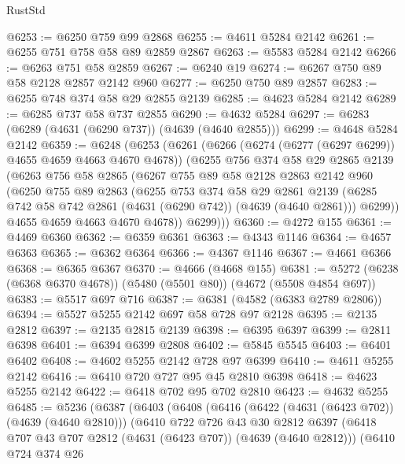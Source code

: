 \begin{lexlean}{RustStd}
\begin{coremodule}
@6253 := @6250 @759 @99 @2868
@6255 := @4611 @5284 @2142
@6261 := @6255 @751 @758 @58 @89 @2859 @2867
@6263 := @5583 @5284 @2142
@6266 := @6263 @751 @58 @2859
@6267 := @6240 @19
@6274 := @6267 @750 @89 @58 @2128 @2857 @2142 @960
@6277 := @6250 @750 @89 @2857
@6283 := @6255 @748 @374 @58 @29 @2855 @2139
@6285 := @4623 @5284 @2142
@6289 := @6285 @737 @58 @737 @2855
@6290 := @4632 @5284
@6297 := @6283 (@6289 (@4631 (@6290 @737)) (@4639 (@4640 @2855)))
@6299 := @4648 @5284 @2142
@6359 := @6248
    (@6253
      (@6261
        (@6266 (@6274 (@6277 (@6297 @6299)) @4655 @4659 @4663 @4670 @4678))
        (@6255
          @756
          @374
          @58
          @29
          @2865
          @2139
          (@6263
            @756
            @58
            @2865
            (@6267
              @755
              @89
              @58
              @2128
              @2863
              @2142
              @960
              (@6250
                @755
                @89
                @2863
                (@6255
                  @753
                  @374
                  @58
                  @29
                  @2861
                  @2139
                  (@6285 @742 @58 @742 @2861 (@4631 (@6290 @742)) (@4639 (@4640 @2861)))
                  @6299))
              @4655
              @4659
              @4663
              @4670
              @4678))
          @6299)))
@6360 := @4272 @155
@6361 := @4469 @6360
@6362 := @6359 @6361
@6363 := @4343 @1146
@6364 := @4657 @6363
@6365 := @6362 @6364
@6366 := @4367 @1146
@6367 := @4661 @6366
@6368 := @6365 @6367
@6370 := @4666 (@4668 @155)
@6381 := @5272 (@6238 (@6368 @6370 @4678)) (@5480 (@5501 @80)) (@4672 (@5508 @4854 @697))
@6383 := @5517 @697 @716
@6387 := @6381 (@4582 (@6383 @2789 @2806))
@6394 := @5527 @5255 @2142 @697 @58 @728 @97 @2128
@6395 := @2135 @2812
@6397 := @2135 @2815 @2139
@6398 := @6395 @6397
@6399 := @2811 @6398
@6401 := @6394 @6399 @2808
@6402 := @5845 @5545
@6403 := @6401 @6402
@6408 := @4602 @5255 @2142 @728 @97 @6399
@6410 := @4611 @5255 @2142
@6416 := @6410 @720 @727 @95 @45 @2810 @6398
@6418 := @4623 @5255 @2142
@6422 := @6418 @702 @95 @702 @2810
@6423 := @4632 @5255
@6485 := @5236
    (@6387
      (@6403
        (@6408
          (@6416
            (@6422 (@4631 (@6423 @702)) (@4639 (@4640 @2810)))
            (@6410
              @722
              @726
              @43
              @30
              @2812
              @6397
              (@6418 @707 @43 @707 @2812 (@4631 (@6423 @707)) (@4639 (@4640 @2812)))
              (@6410
                @724
                @374
                @26

\end{coremodule}
\end{lexlean}
